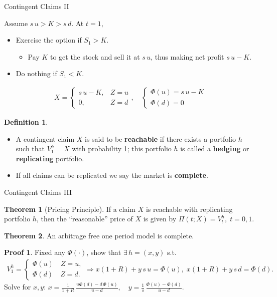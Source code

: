 \documentclass[10pt]{beamer}
\newcommand{\ds}{\displaystyle}
\theoremstyle{definition}
\newtheorem*{dfn}{Definition}
\newtheorem*{thm}{Theorem}
\newtheorem*{prf}{Proof}
\begin{document}
\begin{frame}{Contingent Claims II}
  \begin{example}
    Assume $s\, u > K > s\, d$. At $t=1$, 
    \begin{itemize}
      \item Exercise the option if $S_1 > K$.
        \begin{itemize}
          \item Pay $K$ to get the stock and sell it at $s\,u$, thus making net profit $s\,u-K$.
        \end{itemize}
      \item Do nothing if $S_1 < K$.
    \end{itemize}
    \begin{align*}
      X = \begin{cases}s\,u - K, & Z=u \\ 0,  & Z=d\end{cases}, \quad\begin{cases}\Phi(u) = s\, u - K \\ \Phi(d) = 0\end{cases}
    \end{align*}
  \end{example}
  \begin{dfn}
    \begin{itemize}
      \item A contingent claim $X$ is said to be \textbf{reachable} if there exists a portfolio $h$ such that $V_1^h = X$ with probability 1; this portfolio $h$ is called a \textbf{hedging} or \textbf{replicating} portfolio. 
      \item If all claims can be replicated we say the market is \textbf{complete}.
    \end{itemize}
  \end{dfn}
\end{frame}

\begin{frame}{Contingent Claims III}
\begin{thm}[Pricing Principle]
  If a claim $X$ is reachable with replicating portfolio $h$, then the ``reasonable'' price of $X$ is given by $\ds\Pi(t; X) = V_t^h, \; t=0, 1.$
\end{thm}

\begin{thm}
  An arbitrage free one period model is complete.
\end{thm}

\begin{prf}
  Fixed any $\Phi(\cdot)$, show that $\exists\,h=(x, y)$ s.t.
  \begin{align*}
    V_1^h = \begin{cases}\Phi(u)\quad Z=u,\\ \Phi(d)\quad Z=d.\end{cases}\!\!\!\!\Longrightarrow x(1+R) + y\,s\,u = \Phi(u), \; x(1+R) + y\,s\,d = \Phi(d).
  \end{align*}
  Solve for $x, y$: $\ds x = \frac{1}{1+R}\,\frac{u\Phi(d)-d\,\Phi(u)}{u-d},\quad y = \frac{1}{s}\,\frac{\Phi(u)-\Phi(d)}{u-d}$.
\end{prf}
\end{frame}
\end{document}
